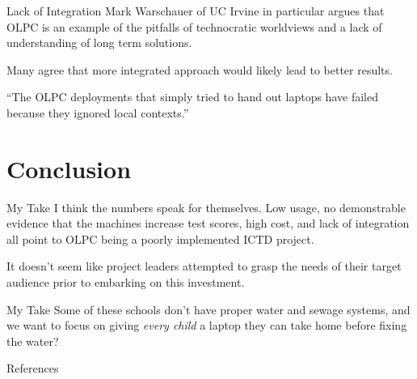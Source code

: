 \documentclass{beamer}
\begin{document}
\begin{frame}{Lack of Integration}
Mark Warschauer of UC Irvine in particular argues that OLPC is an example of the pitfalls of technocratic worldviews and a lack of understanding of long term solutions. \cite{mark}

Many agree that more integrated approach would likely lead to better results. \cite{uru, peru}
\end{frame}

\begin{frame}
``The OLPC deployments that simply tried to hand out laptops have failed because they ignored local contexts.''\cite{mark}
\end{frame}

\section{Conclusion}

\begin{frame}{My Take}
I think the numbers speak for themselves. Low usage, no demonstrable evidence that the machines increase test scores, high cost, and lack of integration all point to OLPC being a poorly implemented ICTD project.

It doesn't seem like project leaders attempted to grasp the needs of their target audience prior to embarking on this investment.
\end{frame}

\begin{frame}{My Take}
Some of these schools don't have proper water and sewage systems, and we want to focus on giving \textit{every child} a laptop they can take home before fixing the water?
\end{frame}

\begin{frame}[allowframebreaks]{References}


\end{frame}
\end{document}
